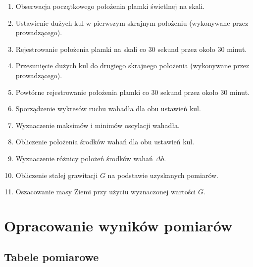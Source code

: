 \documentclass[a4paper,12pt]{article}
\begin{document}
\begin{enumerate}
    \item Obserwacja początkowego położenia plamki świetlnej na skali.
    \item Ustawienie dużych kul w pierwszym skrajnym położeniu (wykonywane przez prowadzącego).
    \item Rejestrowanie położenia plamki na skali co 30 sekund przez około 30 minut.
    \item Przesunięcie dużych kul do drugiego skrajnego położenia (wykonywane przez prowadzącego).
    \item Powtórne rejestrowanie położenia plamki co 30 sekund przez około 30 minut.
    \item Sporządzenie wykresów ruchu wahadła dla obu ustawień kul.
    \item Wyznaczenie maksimów i minimów oscylacji wahadła.
    \item Obliczenie położenia środków wahań dla obu ustawień kul.
    \item Wyznaczenie różnicy położeń środków wahań $\Delta b$.
    \item Obliczenie stałej grawitacji $G$ na podstawie uzyskanych pomiarów.
    \item Oszacowanie masy Ziemi przy użyciu wyznaczonej wartości $G$.
\end{enumerate}

\section{Opracowanie wyników pomiarów}

\subsection{Tabele pomiarowe}
\renewcommand{\arraystretch}{0.85}
\end{document}
